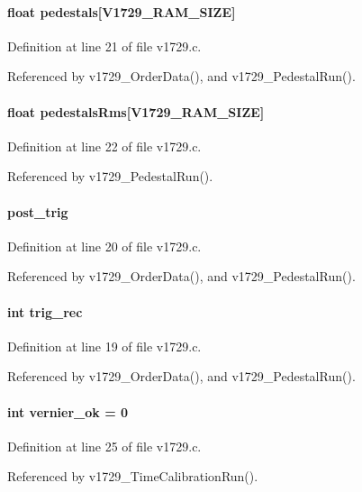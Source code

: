 \paragraph[{pedestals}]{\setlength{\rightskip}{0pt plus 5cm}float {\bf pedestals}\mbox{[}V1729\_\-RAM\_\-SIZE\mbox{]}}\hfill\label{v1729_8c_a020a7ba1c10d5211f56406cbd312a8c0}


Definition at line 21 of file v1729.c.

Referenced by v1729\_\-OrderData(), and v1729\_\-PedestalRun().
\paragraph[{pedestalsRms}]{\setlength{\rightskip}{0pt plus 5cm}float {\bf pedestalsRms}\mbox{[}V1729\_\-RAM\_\-SIZE\mbox{]}}\hfill\label{v1729_8c_a107748fe1dd34d65f052e5769726ce81}


Definition at line 22 of file v1729.c.

Referenced by v1729\_\-PedestalRun().
\paragraph[{post\_\-trig}]{ {\bf post\_\-trig}}\hfill\label{v1729_8c_af94f05e20cb9f6e5756c1a174886e05f}


Definition at line 20 of file v1729.c.

Referenced by v1729\_\-OrderData(), and v1729\_\-PedestalRun().
\paragraph[{trig\_\-rec}]{\setlength{\rightskip}{0pt plus 5cm}int {\bf trig\_\-rec}}\hfill\label{v1729_8c_af926ce3bda4fa1f733d3c196186d436a}


Definition at line 19 of file v1729.c.

Referenced by v1729\_\-OrderData(), and v1729\_\-PedestalRun().
\paragraph[{vernier\_\-ok}]{\setlength{\rightskip}{0pt plus 5cm}int {\bf vernier\_\-ok} = 0}\hfill\label{v1729_8c_a798cd3500bc35b6c750267bbf4cd7fcc}


Definition at line 25 of file v1729.c.

Referenced by v1729\_\-TimeCalibrationRun().